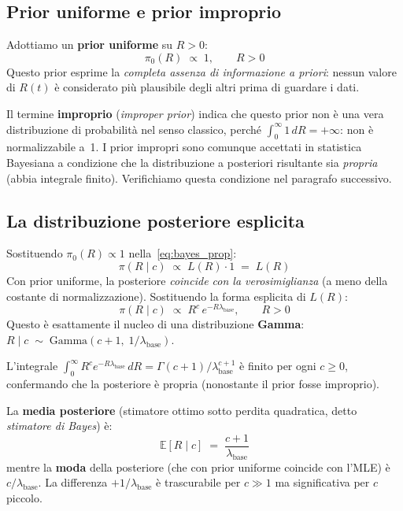 \documentclass[12pt,a4paper]{article}
\newcommand{\lbase}{\lambda_{\mathrm{base}}}
\begin{document}
\subsection{Prior uniforme e prior improprio}

Adottiamo un \textbf{prior uniforme} su $R > 0$:
\begin{equation}
  \pi_0(R) \;\propto\; 1, \qquad R > 0
\end{equation}
Questo prior esprime la \emph{completa assenza di informazione a priori}: nessun
valore di $R(t)$ è considerato più plausibile degli altri prima di guardare i dati.

Il termine \textbf{improprio} (\emph{improper prior}) indica che questo prior non è
una vera distribuzione di probabilità nel senso classico, perché
$\int_0^{\infty} 1\,dR = +\infty$: non è normalizzabile a~1. I prior impropri sono
comunque accettati in statistica Bayesiana a condizione che la distribuzione a
posteriori risultante sia \emph{propria} (abbia integrale finito). Verifichiamo
questa condizione nel paragrafo successivo.

\subsection{La distribuzione posteriore esplicita}

Sostituendo $\pi_0(R) \propto 1$ nella~\eqref{eq:bayes_prop}:
\begin{equation}
  \pi(R \mid c) \;\propto\; L(R)\cdot 1 \;=\; L(R)
  \label{eq:posteriore}
\end{equation}
Con prior uniforme, la posteriore \emph{coincide con la verosimiglianza}
(a meno della costante di normalizzazione). Sostituendo la forma esplicita di $L(R)$:
\begin{equation}
  \pi(R \mid c) \;\propto\; R^c\, e^{-R\lbase}, \qquad R > 0
\end{equation}
Questo è esattamente il nucleo di una distribuzione \textbf{Gamma}:
$R \mid c \;\sim\; \mathrm{Gamma}(c+1,\; 1/\lbase)$.

L'integrale $\int_0^\infty R^c e^{-R\lbase}\,dR = \Gamma(c+1)/\lbase^{c+1}$ è finito
per ogni $c \ge 0$, confermando che la posteriore è propria (nonostante il prior
fosse improprio).

La \textbf{media posteriore} (stimatore ottimo sotto perdita quadratica, detto
\emph{stimatore di Bayes}) è:
\begin{equation}
  \mathbb{E}[R \mid c] \;=\; \frac{c+1}{\lbase}
\end{equation}
mentre la \textbf{moda} della posteriore (che con prior uniforme coincide con l'MLE)
è $c/\lbase$. La differenza $+1/\lbase$ è trascurabile per $c \gg 1$ ma significativa
per $c$ piccolo.
\end{document}
